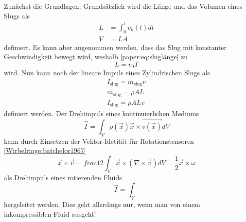 Zunächst die Grundlagen:
Grundsätzlich wird die Länge und das Volumen eines Slugs als
\begin{align}
    L &= \int_{0}^{t}v_k(t)dt\\
    \label{paper:eq:sluglänge}
    V &= LA
\end{align}
definiert.
Es kann aber angenommen werden, dass das Slug mit konstanter Geschwindigkeit bewegt wird, weshalb \ref{paper:eq:sluglänge} zu
\begin{equation}
    L = v_0T
\end{equation}
wird.
Nun kann noch der lineare Impuls eines Zylindrischen Slugs als
\begin{align*}
    I_{\text{slug}} = m_{\text{slug}}v\\
    m_{\text{slug}} = \rho AL\\
    I_{\text{slug}} = \rho ALv
\end{align*}
definiert werden.
Der Drehimpuls eines kontinuierlichen Mediums
\begin{equation}
    \vec{I} = \int_{V}\rho(\vec{x})\vec{x}\times\vec{v(\vec{x})}dV
\end{equation}
kann durch Einsetzen der Vektor-Idetität für Rotationstensoren \ref{Wirbelringe:batchelor1967}
\begin{equation}
    \vec{x}\times\vec{v} = frac{1}{2}\int_{V}\vec{x}\times(\nabla\times\vec{v})dV = \frac{1}{2}\vec{x}\times\omega
\end{equation}
als Drehimpuls eines rotierenden Fluids 
\begin{equation}
    \vec{I} = \int_{V}
\end{equation}
hergeleitet werden. Dies geht allerdings nur, wenn man von einem inkompressiblen Fluid ausgeht!
